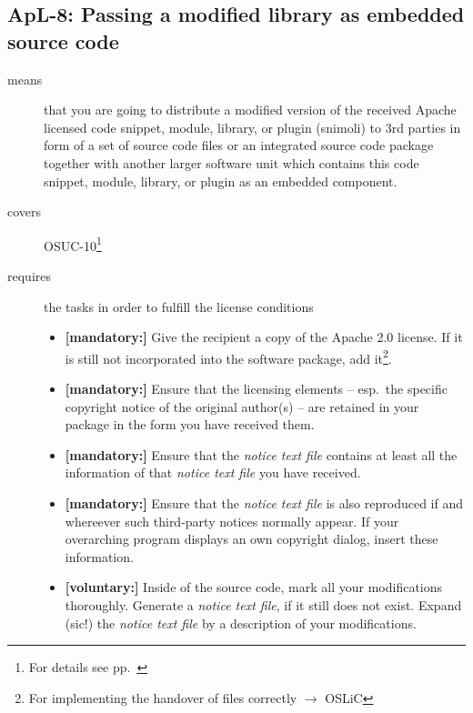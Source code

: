 \subsection{ApL-8: Passing a modified library as embedded source code}
\label{OSUC-10-Apache20}

\begin{description}
\item[means] that you are going to distribute a modified version of the received
Apache licensed code snippet, module, library, or plugin (snimoli) to 3rd
parties in form of a set of source code files or an integrated source code
package together with another larger software unit which contains this code
snippet, module, library, or plugin as an embedded component.
\item[covers] OSUC-10\footnote{For details see pp.\ \pageref{OSUC-10-DEF}}
\item[requires] the tasks in order to fulfill the license conditions
\begin{itemize}
  
  \item \textbf{[mandatory:]} Give the recipient a copy of the Apache 2.0
  license. If it is still not incorporated into the software package, add
  it\footnote{For implementing the handover of files correctly $\rightarrow$
  OSLiC \pageref{DistributingFilesHint}}.

  \item \textbf{[mandatory:]} Ensure that the licensing elements -- esp.\ the
  specific copyright notice of the original author(s) -- are retained in your
  package in the form you have received them.
  
  \item \textbf{[mandatory:]} Ensure that the \emph{notice text file} contains at least
  all the information of that \emph{notice text file} you have received.
 
  \item \textbf{[mandatory:]} Ensure that the \emph{notice text file} is also
  reproduced if and whereever such third-party notices normally appear. If your
  overarching program displays an own copyright dialog, insert these
  information.
 
  \item \textbf{[voluntary:]} Inside of the source code, mark all your
  modifications thoroughly. Generate a \emph{notice text file}, if it still does not
  exist. Expand (sic!) the \emph{notice text file} by a description of your
  modifications.
  

\end{itemize}
\end{description}
